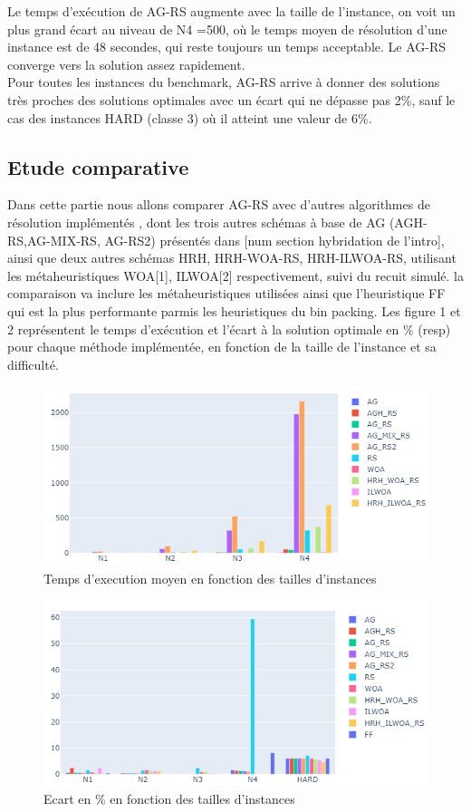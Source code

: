 \documentclass[preprint]{elsarticle}
\begin{document}
Le temps d'exécution de AG-RS augmente avec la taille de l’instance,  on  voit un plus grand écart au niveau de N4 =500, où le temps moyen de résolution d’une instance est de 48 secondes, qui reste toujours un temps acceptable. Le AG-RS converge vers la solution assez rapidement. \\
Pour toutes les instances du benchmark, AG-RS arrive à donner des solutions très proches des solutions optimales avec un écart qui ne dépasse pas 2\%, sauf le cas des instances  HARD (classe 3) où il atteint une valeur de 6\%.
\subsection{Etude comparative}
Dans cette partie nous allons comparer AG-RS avec d’autres algorithmes de résolution  implémentés , dont les trois autres schémas à base de AG (AGH-RS,AG-MIX-RS, AG-RS2) présentés dans [num section hybridation de l’intro], ainsi que deux autres schémas HRH, HRH-WOA-RS, HRH-ILWOA-RS, utilisant les métaheuristiques WOA[1], ILWOA[2] respectivement, suivi du recuit simulé. la comparaison va inclure les métaheuristiques utilisées ainsi que l’heuristique FF qui est la plus performante parmis les heuristiques du bin packing. 
\newline Les figure 1 et 2 représentent le temps d'exécution et l’écart à la solution optimale en \% (resp) pour chaque méthode implémentée,  en fonction de la taille de l’instance et sa difficulté. 

\begin{figure}[!h]
    \centering
    \includegraphics[scale=0.6]{./figures/texec (2).png}
    \caption{Temps d'execution moyen en fonction des tailles d'instances}
\end{figure}
\begin{figure}[!h]
    \centering
    \includegraphics[scale=0.6]{./figures/ecart (2).png}
    \caption{Ecart en \% en fonction des tailles d'instances}
\end{figure}
\end{document}
